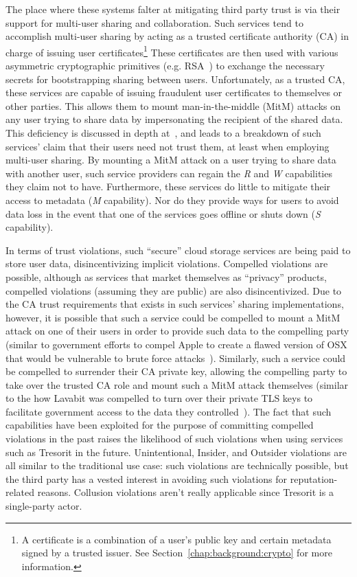 The place where these systems falter at mitigating third party trust
is via their support for multi-user sharing and collaboration. Such
services tend to accomplish multi-user sharing by acting as a trusted
certificate authority (CA) in charge of issuing user
certificates\footnote{A certificate is a combination of a user's
  public key and certain metadata signed by a trusted issuer. See
  Section~\ref{chap:background:crypto} for more information.} These
certificates are then used with various asymmetric cryptographic
primitives (e.g. RSA~\cite{rivest1978}) to exchange the necessary
secrets for bootstrapping sharing between users. Unfortunately, as a
trusted CA, these services are capable of issuing fraudulent user
certificates to themselves or other parties. This allows them to mount
man-in-the-middle (MitM) attacks on any user trying to share data by
impersonating the recipient of the shared data. This deficiency is
discussed in depth at~\cite{wilson2014}, and leads to a breakdown of
such services' claim that their users need not trust them, at least
when employing multi-user sharing. By mounting a MitM attack on a user
trying to share data with another user, such service providers can
regain the \emph{R} and \emph{W} capabilities they claim not to
have. Furthermore, these services do little to mitigate their access
to metadata (\emph{M} capability). Nor do they provide ways for users
to avoid data loss in the event that one of the services goes offline
or shuts down (\emph{S} capability).

In terms of trust violations, such ``secure'' cloud storage services
are being paid to store user data, disincentivizing implicit
violations. Compelled violations are possible, although as services
that market themselves as ``privacy'' products, compelled violations
(assuming they are public) are also disincentivized. Due to the CA
trust requirements that exists in such services' sharing
implementations, however, it is possible that such a service could be
compelled to mount a MitM attack on one of their users in order to
provide such data to the compelling party (similar to government
efforts to compel Apple to create a flawed version of OSX that would
be vulnerable to brute force attacks~\cite{ars-cookvfbi}). Similarly,
such a service could be compelled to surrender their CA private key,
allowing the compelling party to take over the trusted CA role and
mount such a MitM attack themselves (similar to the how Lavabit was
compelled to turn over their private TLS keys to facilitate government
access to the data they controlled~\cite{levsion-lavabit}). The fact
that such capabilities have been exploited for the purpose of
committing compelled violations in the past raises the likelihood of
such violations when using services such as Tresorit in the
future. Unintentional, Insider, and Outsider violations are all
similar to the traditional use case: such violations are technically
possible, but the third party has a vested interest in avoiding such
violations for reputation-related reasons. Collusion violations aren't
really applicable since Tresorit is a single-party actor.

